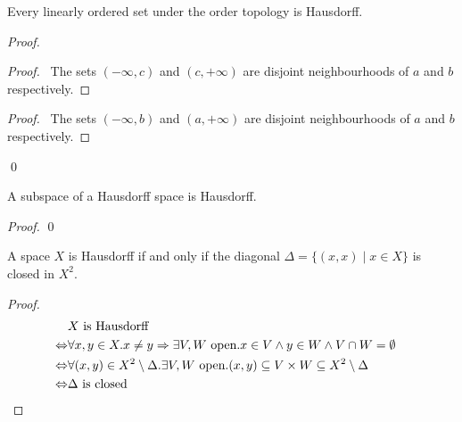 \begin{theorem}
    Every linearly ordered set under the order topology is Hausdorff.
\end{theorem}

\begin{proof}
    \pf
    \begin{proof}
        \pf\ The sets $(-\infty,c)$ and $(c,+\infty)$ are disjoint neighbourhoods of $a$ and $b$
        respectively.
    \end{proof}
    \begin{proof}
        \pf\ The sets $(-\infty, b)$ and $(a,+\infty)$ are disjoint neighbourhoods of $a$ and $b$
        respectively.
    \end{proof}
    \qed
\end{proof}

\begin{theorem}
    \label{theorem:subspace_Haudorff}
    A subspace of a Hausdorff space is Hausdorff.
\end{theorem}

\begin{proof}
    \pf
    \qed
\end{proof}

\begin{proposition}
    A space $X$ is Hausdorff if and only if the diagonal $\Delta = \{ (x,x) \mid x \in X \}$ is closed in $X^2$.
\end{proposition}

\begin{proof}
    \pf
    \begin{align*}
        & X \text{ is Hausdorff} \\
        \Leftrightarrow & \forall x,y \in X. x \neq y \Rightarrow \exists V, W \text{ open}. x \in V \wedge y \in W \wedge V \cap W = \emptyset \\
        \Leftrightarrow & \forall (x,y) \in X^2 \setminus \Delta. \exists V,W \text{ open}. (x,y) \subseteq V \times W \subseteq X^2 \setminus \Delta \\
        \Leftrightarrow & \Delta \text{ is closed} & \qed
    \end{align*}
\end{proof}

